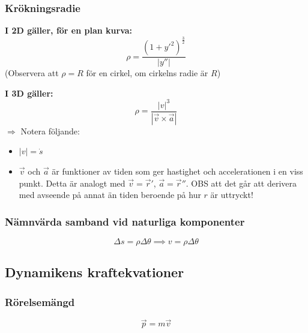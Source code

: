 \documentclass{article}
\newenvironment{ankiflashcard}[1]{}{}
\begin{document}
\begin{paracol}{2}
\subsubsection{Krökningsradie}

\begin{ankiflashcard}{Ställ upp formeln för krökningsradie (2D)}
\textbf{I 2D gäller, för en plan kurva:}
$$
\rho = \frac{(1+y'^2)^{\frac{3}{2}}}{\left| y'' \right|}
$$
(Observera att $\rho = R$ för en cirkel, om cirkelns radie är $R$)
\end{ankiflashcard}

\begin{ankiflashcard}{Ställ upp formeln för krökningsradie (3D)}
    
\textbf{I 3D gäller:}
$$
\rho = \frac{\left|v\right|^3}{\left| \vec v \times \vec a \right|}
$$
$\Rightarrow$ Notera följande:
\begin{itemize}
    \item $\left|v\right|=\dot s$
    \item $\vec v$ och $\vec a$ är funktioner av tiden som ger hastighet och accelerationen i en viss punkt. Detta är analogt med $\vec v = \vec r'$, $\vec a = \vec r''$. OBS att det går att derivera med avseende på annat än tiden beroende på hur $r$ är uttryckt!
\end{itemize}
\end{ankiflashcard}

\subsubsection{Nämnvärda samband vid naturliga komponenter}

\begin{ankiflashcard}{Hur definieras hastighet i naturliga kompontenter? (trevligt trick)}
    $$
    \Delta s = \rho \Delta \theta
    \implies v = \rho \Delta \theta   $$
\end{ankiflashcard}
\subsection{Dynamikens kraftekvationer}

\begin{ankiflashcard}{Definiera rörelsemängd}
    
\subsubsection{Rörelsemängd}
$$\vec p = m \vec v$$
\end{ankiflashcard}


\end{paracol}
\end{document}
